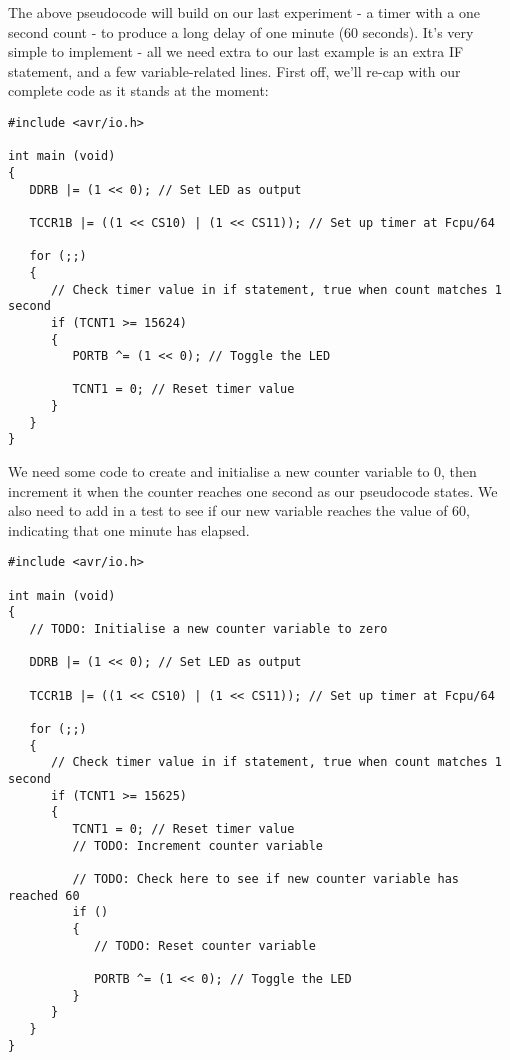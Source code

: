 \documentclass[a4paper,oneside]{book}
\begin{document}
The above pseudocode will build on our last experiment - a timer with a one second count - to produce a long delay of one minute (60 seconds). It's very simple to implement - all we need extra to our last example is an extra IF statement, and a few variable-related lines. First off, we'll re-cap with our complete code as it stands at the moment:

\begin{center}
\begin{lstlisting}
#include <avr/io.h>

int main (void)
{
   DDRB |= (1 << 0); // Set LED as output

   TCCR1B |= ((1 << CS10) | (1 << CS11)); // Set up timer at Fcpu/64

   for (;;)
   {
      // Check timer value in if statement, true when count matches 1 second
      if (TCNT1 >= 15624)
      {
         PORTB ^= (1 << 0); // Toggle the LED

         TCNT1 = 0; // Reset timer value
      }
   }
} 
\end{lstlisting}
\end{center}

We need some code to create and initialise a new counter variable to 0, then increment it when the counter reaches one second as our pseudocode states. We also need to add in a test to see if our new variable reaches the value of 60, indicating that one minute has elapsed. 

\begin{center}
\begin{lstlisting}
#include <avr/io.h>

int main (void)
{
   // TODO: Initialise a new counter variable to zero

   DDRB |= (1 << 0); // Set LED as output

   TCCR1B |= ((1 << CS10) | (1 << CS11)); // Set up timer at Fcpu/64

   for (;;)
   {
      // Check timer value in if statement, true when count matches 1 second
      if (TCNT1 >= 15625)
      {
         TCNT1 = 0; // Reset timer value
         // TODO: Increment counter variable

         // TODO: Check here to see if new counter variable has reached 60
         if ()
         {
            // TODO: Reset counter variable

            PORTB ^= (1 << 0); // Toggle the LED
         }
      }
   }
}
\end{lstlisting}
\end{center}
\end{document}
